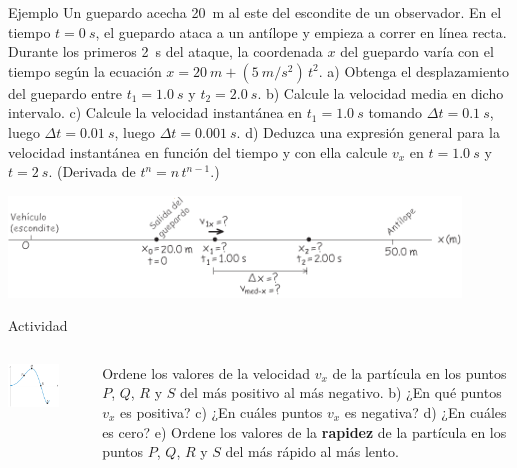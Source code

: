 \documentclass[9pt, aspectratio=169]{beamer}
\begin{document}
\begin{frame}{Ejemplo}
    Un guepardo acecha \qty{20}{m} al este del escondite de un observador. En el tiempo $t = \qty{0}{s}$, el guepardo ataca a un antílope y empieza a correr en línea recta. Durante los primeros \qty{2}{s} del ataque, la coordenada $x$ del guepardo varía con el tiempo según la ecuación $x = \qty{20}{m} + (\qty{5}{m/s^2}) \, t^2$. a) Obtenga el desplazamiento del guepardo entre $t_1 = \qty{1.0}{s}$ y $t_2 = \qty{2.0}{s}$. b) Calcule la velocidad media en dicho intervalo. c) Calcule la velocidad instantánea en $t_1 = \qty{1.0}{s}$ tomando $\Delta t = \qty{0.1}{s}$, luego $\Delta t = \qty{0.01}{s}$, luego $\Delta t = \qty{0.001}{s}$. d) Deduzca una expresión general para la velocidad instantánea en función del tiempo y con ella calcule $v_x$ en $t = \qty{1.0}{s}$ y $t = \qty{2}{s}$. (Derivada de $t^n = n\, t^{n-1}$.)
\begin{center}
    \includegraphics[width=0.9\textwidth]{figs/guepardo.png}
\end{center}
\end{frame}

\begin{frame}{Actividad}
    \begin{columns}
        \begin{center}
            \includegraphics[width=0.7\textwidth]{figs/fig-04.png}
        \end{center}
        Ordene los valores de la velocidad $v_x$ de la partícula en los puntos $P$, $Q$, $R$ y $S$ del más positivo al más negativo. b) ¿En qué puntos $v_x$ es positiva? c) ¿En cuáles puntos $v_x$ es negativa? d) ¿En cuáles es cero? e) Ordene los valores de la \textbf{rapidez} de la partícula en los puntos $P$, $Q$, $R$ y $S$ del más rápido al más lento.
    \end{columns}
\end{frame}
\end{document}
